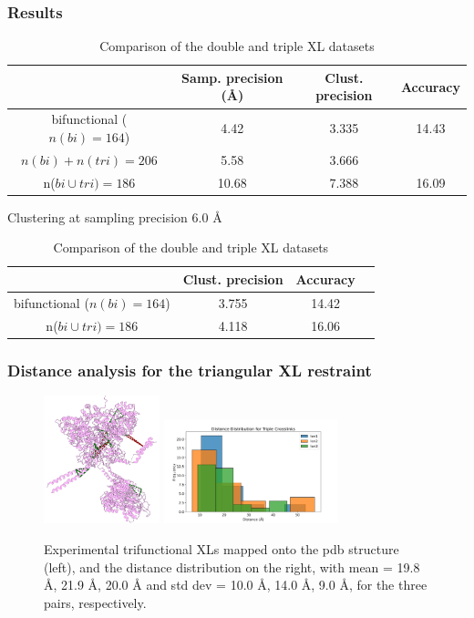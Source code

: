 \documentclass[a4paper,8pt]{beamer}
\begin{document}
\begin{frame}
\frametitle{Results}
\begin{table}
  \centering
  \caption{Comparison of the double and triple XL datasets}
  \begin{tabular}{|c|c|c|c|}
      \hline
                                   & Samp. precision ({\AA}) &  Clust. precision & Accuracy\\ \hline
      bifunctional ($n(bi) = 164$) & 4.42   & 3.335 & 14.43 \\\hline
      $n(bi) + n(tri) = 206$       & 5.58   & 3.666 & \\ \hline
      n($bi \cup tri) = 186$       & 10.68  & 7.388 &  16.09 \\\hline
  \end{tabular}
\end{table}
Clustering at sampling precision $6.0$ {\AA}
\begin{table}
  \centering
  \caption{Comparison of the double and triple XL datasets}
  \begin{tabular}{|c|c|c|c|}
      \hline
                                   &  Clust. precision & Accuracy\\ \hline
      bifunctional ($n(bi) = 164$) &  3.755 & 14.42\\ \hline
      n($bi \cup tri) = 186$       &  4.118 & 16.06\\ \hline
  \end{tabular}
\end{table}
\end{frame}
\begin{frame}
  \frametitle{Distance analysis for the triangular XL restraint}
  \begin{figure}
    \centering
    \includegraphics[width=0.3\textwidth]{test-figures/exp-triples.png}
    \includegraphics[width=0.45\textwidth]{test-figures/tri-distribution.png}
    \caption{Experimental trifunctional XLs mapped onto the pdb structure (left), and the distance distribution on the right, with
    mean = 19.8 {\AA}, 21.9 {\AA}, 20.0 {\AA} and std dev = 10.0 {\AA}, 14.0 {\AA}, 9.0 {\AA}, for the three pairs, respectively.}
    \end{figure}
\end{frame}
\end{document}
